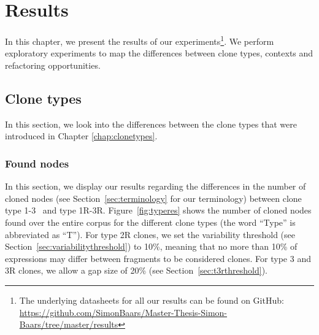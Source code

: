 \chapter{Results}\label{ch:results}
In this chapter, we present the results of our experiments\footnote{The underlying datasheets for all our results can be found on GitHub: \url{https://github.com/SimonBaars/Master-Thesis-Simon-Baars/tree/master/results}}. We perform exploratory experiments to map the differences between clone types, contexts and refactoring opportunities.

\section{Clone types}\label{sec:clonetypeexperiments}
In this section, we look into the differences between the clone types that were introduced in Chapter \ref{chap:clonetypes}.

\subsection{Found nodes}
In this section, we display our results regarding the differences in the number of cloned nodes (see Section~\ref{sec:terminology} for our terminology) between clone type 1-3~\cite{roy2007survey} and type 1R-3R. Figure~\ref{fig:typeres} shows the number of cloned nodes found over the entire corpus for the different clone types (the word ``Type'' is abbreviated as ``T''). For type 2R clones, we set the variability threshold (see Section~\ref{sec:variabilitythreshold}) to 10\%, meaning that no more than 10\% of expressions may differ between fragments to be considered clones. For type 3 and 3R clones, we allow a gap size of 20\% (see Section~\ref{sec:t3rthreshold}).

